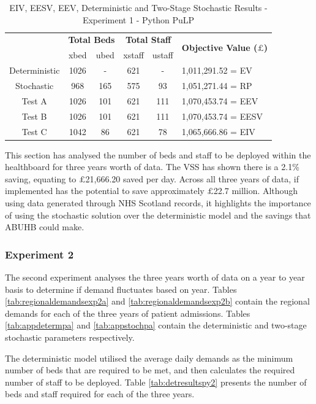 \documentclass[../thesis.tex]{subfiles}
\begin{document}
\begin{table}[h!]
    \centering
    \begin{tabular}{cccccl}\toprule
 & \multicolumn{2}{l}{\textbf{Total Beds}} & \multicolumn{2}{c}{\textbf{Total Staff}} & \multirow{2}{*}{\textbf{Objective Value ($\pounds$)}}\\ \cmidrule(lr){2-3} \cmidrule(lr){4-5}
 & xbed           & ubed          & xstaff         & ustaff         \\ \midrule
     Deterministic & 1026 & - &  621 & - & 1,011,291.52 =  EV \\ \midrule
      Stochastic& 968  & 165 &  575 & 93 &1,051,271.44 = RP\\\midrule
      Test A & 1026 & 101 & 621 & 111 & 1,070,453.74 = EEV \\\midrule
      Test B & 1026 & 101 & 621 & 111 & 1,070,453.74 = EESV \\\midrule
      Test C & 1042 & 86 &  621  & 78 &  1,065,666.86 = EIV\\\bottomrule
    \end{tabular}
    \caption{EIV, EESV, EEV, Deterministic and Two-Stage Stochastic Results - Experiment 1 - Python PuLP}
    \label{tab:eiveevdettwostageresults1python}
\end{table}
This section has analysed the number of beds and staff to be deployed within the healthboard for three years worth of data. The VSS has shown there is a 2.1\% saving, equating to $\pounds$21,666.20 saved per day. Across all three years of data, if implemented has the potential to save approximately $\pounds$22.7 million. Although using data generated through NHS Scotland records, it highlights the importance of using the stochastic solution over the deterministic model and the savings that ABUHB could make. 

\subsubsection{Experiment 2}
The second experiment analyses the three years worth of data on a year to year basis to determine if demand fluctuates based on year. Tables \ref{tab:regionaldemandsexp2a} and \ref{tab:regionaldemandsexp2b} contain the regional demands for each of the three years of patient admissions. Tables \ref{tab:appdetermpa} and \ref{tab:appstochpa} contain the deterministic and two-stage stochastic parameters respectively. 

The deterministic model utilised the average daily demands as the minimum number of beds that are required to be met, and then calculates the required number of staff to be deployed. Table \ref{tab:detresultspy2} presents the number of beds and staff required for each of the three years.
\end{document}
